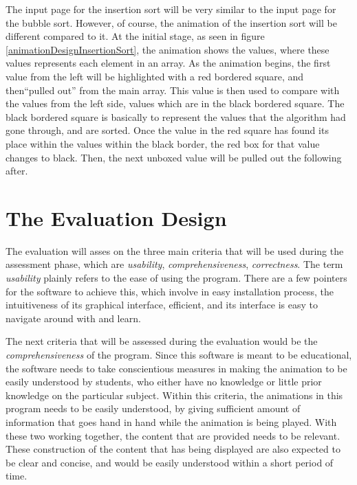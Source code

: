 The input page for the insertion sort will be very similar to the input page for the bubble sort. However, of course, the animation of the insertion sort will be different compared to it. At the initial stage, as seen in figure \ref{animationDesignInsertionSort}, the animation shows the values, where these values represents each element in an array. As the animation begins, the first value from the left will be highlighted with a red bordered square, and then``pulled out'' from the main array. This value is then used to compare with the values from the left side, values which are in the black bordered square. The black bordered square is basically to represent the values that the algorithm had gone through, and are sorted. Once the value in the red square has found its place within the values within the black border, the red box for that value changes to black. Then, the next unboxed value will be pulled out the following after.



\section{The Evaluation Design} \label{sec:evaluationDesign}


The evaluation will asses on the three main criteria that will be used during the assessment phase, which are \textit{usability}, \textit{comprehensiveness}, \textit{correctness}. The term \textit{usability} plainly refers to the ease of using the program. There are a few pointers for the software to achieve this, which involve in easy installation process, the intuitiveness of its graphical interface, efficient, and its interface is easy to navigate around with and learn\cite{userFriendliness}.

The next criteria that will be assessed during the evaluation would be the \textit{comprehensiveness} of the program. Since this software is meant to be educational, the software needs to take conscientious measures in making the animation to be easily understood by students, who either have no knowledge or little prior knowledge on the particular subject. Within this criteria, the animations in this program needs to be easily understood, by giving sufficient amount of information that goes hand in hand while the animation is being played. With these two working together, the content that are provided needs to be relevant. These construction of the content that has being displayed are also expected to be clear and concise, and would be easily understood within a short period of time. 

